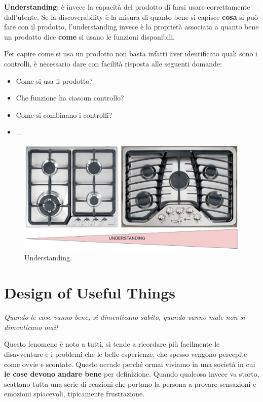 \textbf{Understanding}: è invece la capacità del prodotto di farsi usare correttamente dall'utente. Se la discoverability è la misura di quanto bene si capisce \textbf{cosa} si può fare con il prodotto, l'understanding invece è la proprietà associata a quanto bene un prodotto dice \textbf{come} si usano le funzioni disponibili.

Per capire come si usa un prodotto non basta infatti aver identificato quali sono i controlli, è necessario dare con facilità risposta alle seguenti domande:

\begin{itemize}
    \item Come si usa il prodotto?
    \item Che funzione ha ciascun controllo?
    \item Come si combinano i controlli?
    \item...
\end{itemize}




\begin{figure}[!h]
	\centering
	\includegraphics[width=\textwidth]{immagini/understanding.png}
	\caption{Understanding.}
\end{figure}


\section{Design of Useful Things}
\begin{flushleft}
	\textit{Quando le cose vanno bene, si dimenticano subito, quando vanno male non si dimenticano mai!}
\end{flushleft}

Questo fenomeno è noto a tutti, si tende a ricordare più facilmente le disavventure e i problemi che le belle esperienze, che spesso vengono percepite come ovvie e scontate. Questo accade perché ormai viviamo in una società in cui \textbf{le cose devono andare bene} per definizione. Quando qualcosa invece va storto, scattano tutta una serie di reazioni che portano la persona a provare sensazioni e emozioni spiacevoli, tipicamente frustrazione. 

